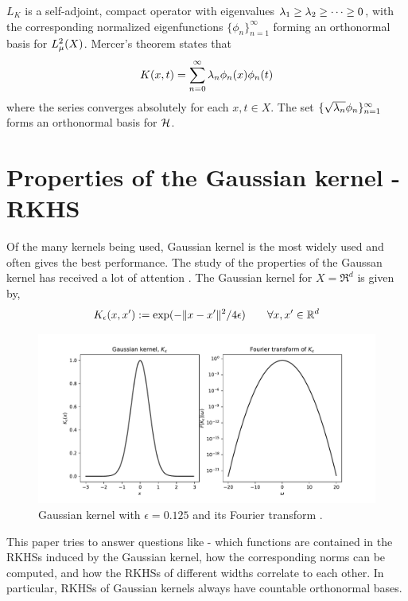  $L_K$ is a self-adjoint, compact operator with eigenvalues $\lambda_1 \geq \lambda_2 \geq \cdots \geq 0$, with the corresponding normalized eigenfunctions $\{\phi_n\}_{n=1}^\infty$ forming an orthonormal basis for $L^2_\mu(X)$. Mercer's theorem states that 
\[
K(x,t) = \sum_{n=0}^\infty \lambda_n \phi_n(x) \phi_n(t)
\]
where the series converges absolutely for each $x,t \in X$. The set $\{\sqrt{\lambda_n}\phi_n\}_{n=1}^\infty$ forms an orthonormal basis for ${\cal H}$. 


\section{Properties of the Gaussian kernel -  RKHS}
\label{s:gaussian_rkhs}

Of the many kernels being used, Gaussian kernel is the most widely used and often gives the best performance. The study of the properties of the Gaussan kernel has received a lot of attention \cite{stehussco06, min10}. The Gaussian kernel for $X = \Re^d$ is given by,
\[
K_{\epsilon}(x,x') := \exp(-\|x - x'\|^2/ 4\epsilon) \qquad \forall x,x' \in \mathbb{R}^d
\]

\begin{figure}[htbp]
	\centering
	\includegraphics[width=5in]{images/Chap3_Gaussian_kernel}
	\caption{Gaussian kernel with $\epsilon = 0.125$ and its Fourier transform \cite{schsmo01}.}
	\label{fig:gaussian_kernel}
\end{figure}

This paper tries to answer questions like - which functions are contained in the RKHSs induced by the Gaussian kernel, how the corresponding norms can be computed, and how the RKHSs of different widths correlate to each other. 
In particular, RKHSs of Gaussian kernels always have countable orthonormal bases. 

